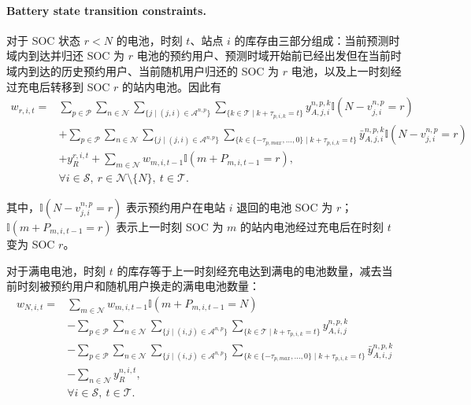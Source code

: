 \documentclass[12pt,hyperref,a4paper,UTF8]{ctexart}
\begin{document}
\paragraph{Battery state transition constraints.}
对于 SOC 状态 $r<N$ 的电池，时刻 $t$、站点 $i$ 的库存由三部分组成：当前预测时域内到达并归还 SOC 为 $r$ 电池的预约用户、预测时域开始前已经出发但在当前时域内到达的历史预约用户、当前随机用户归还的 SOC 为 $r$ 电池，以及上一时刻经过充电后转移到 SOC $r$ 的站内电池。因此有
\begin{equation}
\begin{aligned}
w_{r,i,t}
=&
\sum_{p\in \mathcal{P}}
\sum_{n\in \mathcal{N}}
\sum_{\{j\mid (j,i)\in \mathcal{A}^{n,p}\}}
\sum_{\{k\in \mathcal{T}\mid k+\tau_{p,i,k}=t\}}
y^{n,p,k}_{A,j,i}
\mathbb{I}\!\left(N-v^{n,p}_{j,i}=r\right)
\\
&+
\sum_{p\in \mathcal{P}}
\sum_{n\in \mathcal{N}}
\sum_{\{j\mid (j,i)\in \mathcal{A}^{n,p}\}}
\sum_{\{k\in \{-\tau_{p,max},\ldots,0\}\mid k+\tau_{p,i,k}=t\}}
\bar{y}^{n,p,k}_{A,j,i}
\mathbb{I}\!\left(N-v^{n,p}_{j,i}=r\right)
\\
&+
y^{r,i,t}_{R}
+
\sum_{m\in \mathcal{N}}
w_{m,i,t-1}
\mathbb{I}\!\left(m+P_{m,i,t-1}=r\right),
\\
&\forall i\in \mathcal{S},\ r\in \mathcal{N}\setminus\{N\},\ t\in \mathcal{T}.
\end{aligned}
\label{eq:transition_nonfull}
\end{equation}

其中，$\mathbb{I}(N-v^{n,p}_{j,i}=r)$ 表示预约用户在电站 $i$ 退回的电池 SOC 为 $r$；$\mathbb{I}(m+P_{m,i,t-1}=r)$ 表示上一时刻 SOC 为 $m$ 的站内电池经过充电后在时刻 $t$ 变为 SOC $r$。

对于满电电池，时刻 $t$ 的库存等于上一时刻经充电达到满电的电池数量，减去当前时刻被预约用户和随机用户换走的满电电池数量：
\begin{equation}
\begin{aligned}
w_{N,i,t}
=&
\sum_{m\in \mathcal{N}}
w_{m,i,t-1}
\mathbb{I}\!\left(m+P_{m,i,t-1}=N\right)
\\
&-
\sum_{p\in \mathcal{P}}
\sum_{n\in \mathcal{N}}
\sum_{\{j\mid (i,j)\in \mathcal{A}^{n,p}\}}
\sum_{\{k\in \mathcal{T}\mid k+\tau_{p,i,k}=t\}}
y^{n,p,k}_{A,i,j}
\\
&-
\sum_{p\in \mathcal{P}}
\sum_{n\in \mathcal{N}}
\sum_{\{j\mid (i,j)\in \mathcal{A}^{n,p}\}}
\sum_{\{k\in \{-\tau_{p,max},\ldots,0\}\mid k+\tau_{p,i,k}=t\}}
\bar{y}^{n,p,k}_{A,i,j}
\\
&-
\sum_{n\in \mathcal{N}}
y^{n,i,t}_{R},
\\
&\forall i\in \mathcal{S},\ t\in \mathcal{T}.
\end{aligned}
\label{eq:transition_full}
\end{equation}
\end{document}
